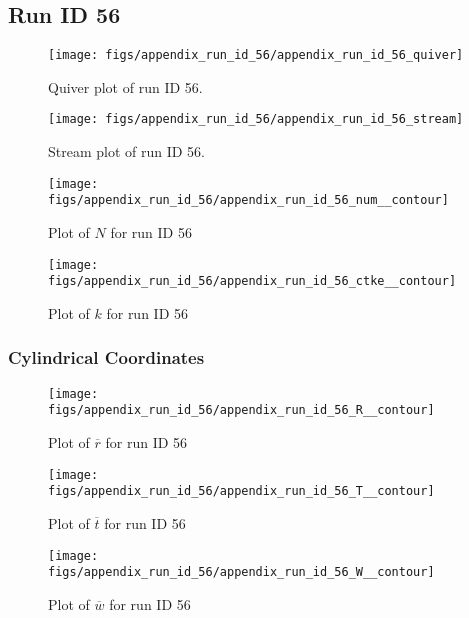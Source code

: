 \subsection{Run ID 56}
\begin{figure}[H]
\centering
\texttt{[image: figs/appendix\_run\_id\_56/appendix\_run\_id\_56\_quiver]}
\caption{Quiver plot of run ID 56.}
\label{fig:appendix_run_id_56_quiver}
\end{figure}


\begin{figure}[H]
\centering
\texttt{[image: figs/appendix\_run\_id\_56/appendix\_run\_id\_56\_stream]}
\caption{Stream plot of run ID 56.}
\label{fig:appendix_run_id_56_stream}
\end{figure}


\begin{figure}[H]
\centering
\texttt{[image: figs/appendix\_run\_id\_56/appendix\_run\_id\_56\_num\_\_contour]}
\caption{Plot of $N$ for run ID 56}
\label{fig:appendix_run_id_56_num__contour}
\end{figure}


\begin{figure}[H]
\centering
\texttt{[image: figs/appendix\_run\_id\_56/appendix\_run\_id\_56\_ctke\_\_contour]}
\caption{Plot of $k$ for run ID 56}
\label{fig:appendix_run_id_56_ctke__contour}
\end{figure}


\subsubsection{Cylindrical Coordinates}
\begin{figure}[H]
\centering
\texttt{[image: figs/appendix\_run\_id\_56/appendix\_run\_id\_56\_R\_\_contour]}
\caption{Plot of $\overline{r}$ for run ID 56}
\label{fig:appendix_run_id_56_R__contour}
\end{figure}


\begin{figure}[H]
\centering
\texttt{[image: figs/appendix\_run\_id\_56/appendix\_run\_id\_56\_T\_\_contour]}
\caption{Plot of $\overline{t}$ for run ID 56}
\label{fig:appendix_run_id_56_T__contour}
\end{figure}


\begin{figure}[H]
\centering
\texttt{[image: figs/appendix\_run\_id\_56/appendix\_run\_id\_56\_W\_\_contour]}
\caption{Plot of $\overline{w}$ for run ID 56}
\label{fig:appendix_run_id_56_W__contour}
\end{figure}


